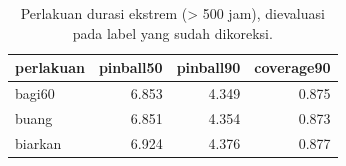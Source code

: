 \begin{table}[ht]
\centering\small
\begin{tabular}{lrrr}
\toprule
perlakuan & pinball50 & pinball90 & coverage90 \\
\midrule
bagi60 & 6.853 & 4.349 & 0.875 \\
buang & 6.851 & 4.354 & 0.873 \\
biarkan & 6.924 & 4.376 & 0.877 \\
\bottomrule
\end{tabular}
\caption{Perlakuan durasi ekstrem (> 500 jam), dievaluasi pada label yang sudah dikoreksi.}
\label{tab:t1_audit_target}
\end{table}
